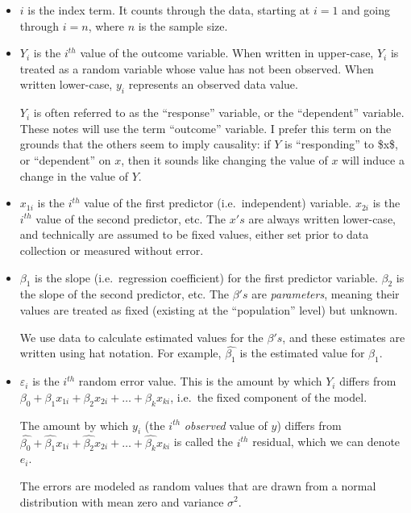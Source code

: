 \documentclass[
  letterpaper,
  DIV=11,
  numbers=noendperiod]{scrreprt}
\begin{document}
\begin{itemize}
\item
  \(i\) is the index term. It counts through the data, starting at
  \(i = 1\) and going through \(i=n\), where \(n\) is the sample size.
\item
  \(Y_i\) is the \(i^{th}\) value of the outcome variable. When written
  in upper-case, \(Y_i\) is treated as a random variable whose value has
  not been observed. When written lower-case, \(y_i\) represents an
  observed data value.

  \(Y_i\) is often referred to as the ``response'' variable, or the
  ``dependent'' variable. These notes will use the term ``outcome''
  variable. I prefer this term on the grounds that the others seem to
  imply causality: if \(Y\) is ``responding'' to \$x\$, or ``dependent''
  on \(x\), then it sounds like changing the value of \(x\) will induce
  a change in the value of \(Y\).
\item
  \(x_{1i}\) is the \(i^{th}\) value of the first predictor
  (i.e.~independent) variable. \(x_{2i}\) is the \(i^{th}\) value of the
  second predictor, etc. The \(x's\) are always written lower-case, and
  technically are assumed to be fixed values, either set prior to data
  collection or measured without error.
\item
  \(\beta_1\) is the slope (i.e.~regression coefficient) for the first
  predictor variable. \(\beta_2\) is the slope of the second predictor,
  etc. The \(\beta's\) are \emph{parameters}, meaning their values are
  treated as fixed (existing at the ``population'' level) but unknown.

  We use data to calculate estimated values for the \(\beta's\), and
  these estimates are written using hat notation. For example,
  \(\hat{\beta_1}\) is the estimated value for \(\beta_1\).
\item
  \(\varepsilon_i\) is the \(i^{th}\) random error value. This is the
  amount by which \(Y_i\) differs from
  \(\beta_0+\beta_1x_{1i} + \beta_2x_{2i} + \dots + \beta_kx_{ki}\),
  i.e.~the fixed component of the model.

  The amount by which \(y_i\) (the \(i^{th}\) \emph{observed} value of
  \(y\)) differs from
  \(\hat{\beta_0}+\hat{\beta_1}x_{1i} + \hat{\beta_2}x_{2i} + \dots + \hat{\beta_k}x_{ki}\)
  is called the \(i^{th}\) residual, which we can denote \(e_i\).

  The errors are modeled as random values that are drawn from a normal
  distribution with mean zero and variance \(\sigma^2\).
\end{itemize}
\end{document}
